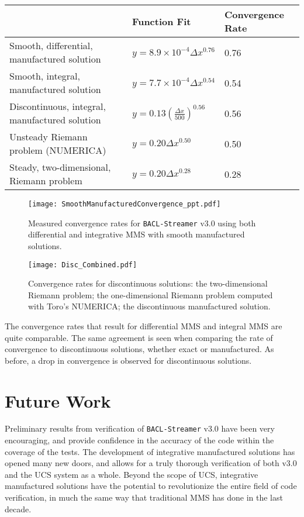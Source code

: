 \begin{tabular}[]{|l|l|l|}
\label{tab:v3.0-convergence-fits}
 & Function Fit&Convergence Rate\\
\hline
Smooth, differential, manufactured solution&
$y=8.9\times10^{-4}\Delta x^{0.76}$&0.76\\

Smooth, integral, manufactured solution&
$y=7.7\times10^{-4}\Delta x^{0.54}$&0.54\\

Discontinuous, integral, manufactured solution&
$y=0.13\left(\frac{\Delta x}{500}\right)^{0.56}$&0.56\\

Unsteady Riemann problem (NUMERICA)& $y=0.20\Delta x^{0.50}$&0.50\\

Steady, two-dimensional, Riemann problem& $y=0.20\Delta x^{0.28}$&0.28\\
\hline
\end{tabular}

\begin{figure}
\centering
\label{fig:smooth-manufactured-convergence}
\texttt{[image: SmoothManufacturedConvergence\_ppt.pdf]}
\caption{Measured convergence rates for {\tt BACL-Streamer} v3.0 using both differential and integrative MMS with smooth manufactured solutions.}
\end{figure}

\begin{figure}
\centering
\label{fig:disc-manufactured-convergence}
\texttt{[image: Disc\_Combined.pdf]}
\caption{Convergence rates for discontinuous solutions: the two-dimensional Riemann problem; the one-dimensional Riemann problem computed with Toro's NUMERICA; the discontinuous manufactured solution.}
\end{figure}

The convergence rates that result for differential MMS and integral MMS are quite comparable. The same agreement is seen when comparing the rate of convergence to discontinuous solutions, whether exact or manufactured. As before, a drop in convergence is observed for discontinuous solutions. 

\section{Future Work}
\label{sec:ver-future}
Preliminary results from verification of {\tt BACL-Streamer} v3.0 have been very encouraging, and provide confidence in the accuracy of the code within the coverage of the tests. The development of integrative manufactured solutions has opened many new doors, and allows for a truly thorough verification of both v3.0 and the UCS system as a whole. Beyond the scope of UCS, integrative manufactured solutions have the potential to revolutionize the entire field of code verification, in much the same way that traditional MMS has done in the last decade. 

